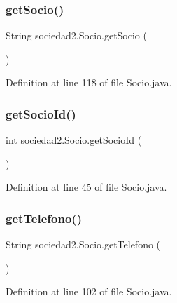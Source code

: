 \subsubsection{\texorpdfstring{get\+Socio()}{getSocio()}}
{\footnotesize\ttfamily String sociedad2.\+Socio.\+get\+Socio (\begin{DoxyParamCaption}{ }\end{DoxyParamCaption})}



Definition at line 118 of file Socio.\+java.

\mbox{\label{classsociedad2_1_1_socio_a90990705fb988f1372f480e48138a92e}} 
\subsubsection{\texorpdfstring{get\+Socio\+Id()}{getSocioId()}}
{\footnotesize\ttfamily int sociedad2.\+Socio.\+get\+Socio\+Id (\begin{DoxyParamCaption}{ }\end{DoxyParamCaption})}



Definition at line 45 of file Socio.\+java.

\mbox{\label{classsociedad2_1_1_socio_afd9e158c9ea49006ccc815e2c3c43fc0}} 
\subsubsection{\texorpdfstring{get\+Telefono()}{getTelefono()}}
{\footnotesize\ttfamily String sociedad2.\+Socio.\+get\+Telefono (\begin{DoxyParamCaption}{ }\end{DoxyParamCaption})}



Definition at line 102 of file Socio.\+java.

\mbox{\label{classsociedad2_1_1_socio_a6a102064814f7634ad69f1543634c967}} 
